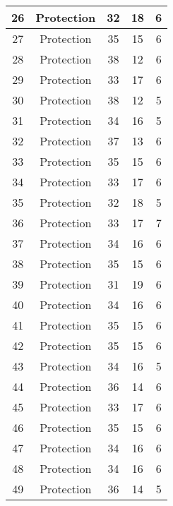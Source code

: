 \documentclass[results.tex]{subfiles}
\begin{document}
\begin{center}
\begin{tabular}{| c || c | c | c | c |}
    \hline
    26 & Protection & 32 & 18 & 6 \\ 
    \hline
    27 & Protection & 35 & 15 & 6 \\ 
    \hline
    28 & Protection & 38 & 12 & 6 \\ 
    \hline
    29 & Protection & 33 & 17 & 6 \\ 
    \hline
    30 & Protection & 38 & 12 & 5 \\ 
    \hline
    31 & Protection & 34 & 16 & 5 \\ 
    \hline
    32 & Protection & 37 & 13 & 6 \\ 
    \hline
    33 & Protection & 35 & 15 & 6 \\ 
    \hline
    34 & Protection & 33 & 17 & 6 \\ 
    \hline
    35 & Protection & 32 & 18 & 5 \\ 
    \hline
    36 & Protection & 33 & 17 & 7 \\ 
    \hline
    37 & Protection & 34 & 16 & 6 \\ 
    \hline
    38 & Protection & 35 & 15 & 6 \\ 
    \hline
    39 & Protection & 31 & 19 & 6 \\ 
    \hline
    40 & Protection & 34 & 16 & 6 \\ 
    \hline
    41 & Protection & 35 & 15 & 6 \\ 
    \hline
    42 & Protection & 35 & 15 & 6 \\ 
    \hline
    43 & Protection & 34 & 16 & 5 \\ 
    \hline
    44 & Protection & 36 & 14 & 6 \\ 
    \hline
    45 & Protection & 33 & 17 & 6 \\ 
    \hline
    46 & Protection & 35 & 15 & 6 \\ 
    \hline
    47 & Protection & 34 & 16 & 6 \\ 
    \hline
    48 & Protection & 34 & 16 & 6 \\ 
    \hline
    49 & Protection & 36 & 14 & 5 \\ 
    \hline   \end{tabular}
\end{center}
\end{document}
